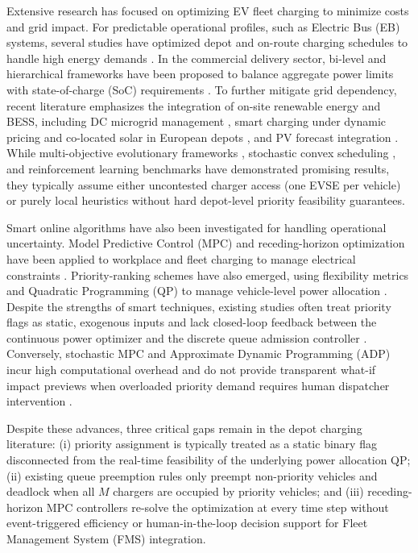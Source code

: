\documentclass[final,3p,times,twocolumn]{elsarticle}
\begin{document}
Extensive research has focused on optimizing EV fleet charging to minimize costs and grid impact. For predictable operational profiles, such as Electric Bus (EB) systems, several studies have optimized depot and on-route charging schedules to handle high energy demands \cite{he2020optimal,hosseini2023optimizing,meng2024research,shi2022energy}. In the commercial delivery sector, bi-level and hierarchical frameworks have been proposed to balance aggregate power limits with state-of-charge (SoC) requirements \cite{skugor2016bilevel,skugor2025hierarchical}. To further mitigate grid dependency, recent literature emphasizes the integration of on-site renewable energy and BESS, including DC microgrid management \cite{dicorato2019integrated}, smart charging under dynamic pricing and co-located solar in European depots \cite{chen2025optimal,corsetti2024commercial}, and PV forecast integration \cite{vandermeer2018energy}. While multi-objective evolutionary frameworks \cite{liu2023multiobjective}, stochastic convex scheduling \cite{qureshi2024multiobjective}, and reinforcement learning benchmarks \cite{orfanoudakis2025ev2gym,mei2026multiagent,vales2026emergent} have demonstrated promising results, they typically assume either uncontested charger access (one EVSE per vehicle) or purely local heuristics without hard depot-level priority feasibility guarantees.

Smart online algorithms have also been investigated for handling operational uncertainty. Model Predictive Control (MPC) and receding-horizon optimization have been applied to workplace and fleet charging to manage electrical constraints \cite{frendo2019realtime,tang2016model,skugor2025hierarchical}. Priority-ranking schemes have also emerged, using flexibility metrics and Quadratic Programming (QP) to manage vehicle-level power allocation \cite{lokhande2024realtime}. Despite the strengths of smart techniques, existing studies often treat priority flags as static, exogenous inputs and lack closed-loop feedback between the continuous power optimizer and the discrete queue admission controller \cite{alinia2020online,lee2019acndata}. Conversely, stochastic MPC \cite{pozzi2022stochastic} and Approximate Dynamic Programming (ADP) \cite{mahyari2025electric} incur high computational overhead and do not provide transparent what-if impact previews when overloaded priority demand requires human dispatcher intervention \cite{chandra2024comprehensive,motlagh2026review}.

Despite these advances, three critical gaps remain in the depot charging literature: (i) priority assignment is typically treated as a static binary flag disconnected from the real-time feasibility of the underlying power allocation QP; (ii) existing queue preemption rules only preempt non-priority vehicles and deadlock when all $M$ chargers are occupied by priority vehicles; and (iii) receding-horizon MPC controllers re-solve the optimization at every time step without event-triggered efficiency or human-in-the-loop decision support for Fleet Management System (FMS) integration.
\end{document}
